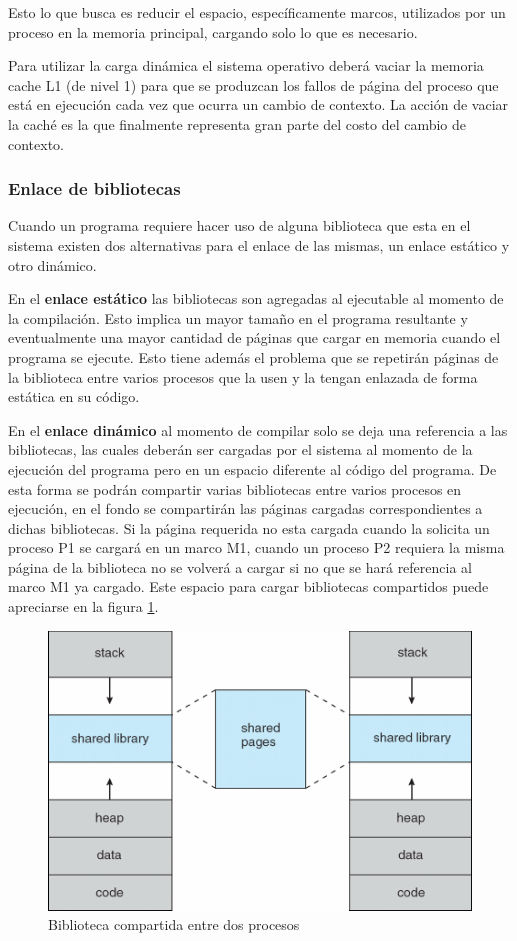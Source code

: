 Esto lo que busca es reducir el espacio, específicamente marcos, utilizados por
un proceso en la memoria principal, cargando solo lo que es necesario.

Para utilizar la carga dinámica el sistema operativo deberá vaciar la memoria
cache L1 (de nivel 1) para que se produzcan los fallos de página del proceso que
está en ejecución cada vez que ocurra un cambio de contexto. La acción de vaciar
la caché es la que finalmente representa gran parte del costo del cambio de
contexto.

\subsubsection{Enlace de bibliotecas}
Cuando un programa requiere hacer uso de alguna biblioteca que esta en el
sistema existen dos alternativas para el enlace de las mismas, un enlace
estático y otro dinámico.

En el \textbf{enlace estático} las bibliotecas son agregadas al ejecutable al
momento de la compilación. Esto implica un mayor tamaño en el programa
resultante y eventualmente una mayor cantidad de páginas que cargar en memoria
cuando el programa se ejecute. Esto tiene además el problema que se repetirán
páginas de la biblioteca entre varios procesos que la usen y la tengan enlazada
de forma estática en su código.

En el \textbf{enlace dinámico} al momento de compilar solo se deja una
referencia a las bibliotecas, las cuales deberán ser cargadas por el sistema al
momento de la ejecución del programa pero en un espacio diferente al código del
programa. De esta forma se podrán compartir varias bibliotecas entre varios
procesos en ejecución, en el fondo se compartirán las páginas cargadas
correspondientes a dichas bibliotecas. Si la página requerida no esta cargada
cuando la solicita un proceso P1 se cargará en un marco M1, cuando un proceso P2
requiera la misma página de la biblioteca no se volverá a cargar si no que se
hará referencia al marco M1 ya cargado. Este espacio para cargar bibliotecas
compartidos puede apreciarse en la figura \ref{fig:biblioteca_compartida}.

\begin{figure}[htbp]
\centering
\includegraphics[scale=0.45]{img/C07_memoria/biblioteca_compartida.png}
\caption{Biblioteca compartida entre dos procesos}
\label{fig:biblioteca_compartida}
\end{figure}

